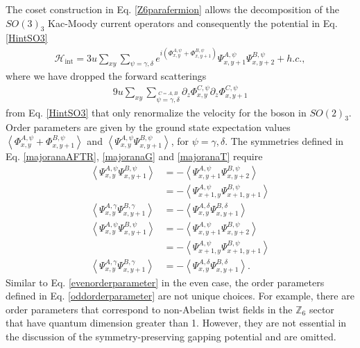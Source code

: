 The coset construction in Eq. \eqref{Z6parafermion} allows the decomposition of the $SO(3)_3$ Kac-Moody current operators and consequently the potential in Eq. \eqref{HintSO3} \begin{align}\mathcal{H}_{\mathrm{int}}=3u\sum_{xy}\sum_{\psi=\gamma,\delta}e^{i(\Phi^{A,\psi}_{x,y}+\Phi^{B,\psi}_{x,y+1})}\Psi^{A,\psi}_{x,y+1}\Psi^{B,\psi}_{x,y+2}+h.c.,\label{HintZ6}\end{align}
where we have dropped the forward scatterings \begin{align}9u\sum_{xy}\sum_{\stackrel{C=A,B}{\psi=\gamma,\delta}}\partial_z\Phi^{C,\psi}_{x,y}\partial_z\Phi^{C,\psi}_{x,y+1}\end{align} from Eq. \eqref{HintSO3} that only renormalize the velocity for the boson in $SO(2)_3$. Order parameters are given by the ground state expectation values $\left\langle\Phi^{A,\psi}_{x,y}+\Phi^{B,\psi}_{x,y+1}\right\rangle$ and $\left\langle\Psi^{A,\psi}_{x,y}\Psi^{B,\psi}_{x,y+1}\right\rangle$, for $\psi=\gamma,\delta$. The symmetries defined in Eq. \eqref{majoranaAFTR}, \eqref{majoranaG} and \eqref{majoranaT} require \begin{align}\left\langle\Psi^{A,\psi}_{x,y}\Psi^{B,\psi}_{x,y+1}\right\rangle&=-\left\langle\Psi^{A,\psi}_{x,y+1}\Psi^{B,\psi}_{x,y+2}\right\rangle\nonumber\\&=-\left\langle\Psi^{A,\psi}_{x+1,y}\Psi^{B,\psi}_{x+1,y+1}\right\rangle\nonumber\\\left\langle\Psi^{A,\gamma}_{x,y}\Psi^{B,\gamma}_{x,y+1}\right\rangle&=-\left\langle\Psi^{A,\delta}_{x,y}\Psi^{B,\delta}_{x,y+1}\right\rangle\nonumber\\\left\langle\Psi^{A,\psi}_{x,y}\Psi^{B,\psi}_{x,y+1}\right\rangle&=-\left\langle\Psi^{A,\psi}_{x,y+1}\Psi^{B,\psi}_{x,y+2}\right\rangle\nonumber\\&=-\left\langle\Psi^{A,\psi}_{x+1,y}\Psi^{B,\psi}_{x+1,y+1}\right\rangle\nonumber\\\left\langle\Psi^{A,\gamma}_{x,y}\Psi^{B,\gamma}_{x,y+1}\right\rangle&=-\left\langle\Psi^{A,\delta}_{x,y}\Psi^{B,\delta}_{x,y+1}\right\rangle.\label{oddorderparameter}\end{align} Similar to Eq. \eqref{evenorderparameter} in the even case, the order parameters defined in Eq. \eqref{oddorderparameter} are not unique choices. For example, there are order parameters that correspond to non-Abelian twist fields in the $\mathbb{Z}_6$ sector that have quantum dimension greater than 1. However, they are not essential in the discussion of the symmetry-preserving gapping potential and are omitted.
